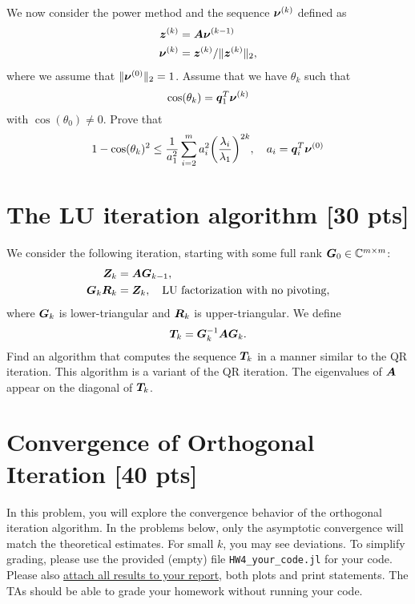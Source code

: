 \documentclass[twoside,10pt]{article}
\begin{document}
We now consider the power method and the sequence $\bm{\nu}^{(k)}$  defined as 
\begin{align}
  \bm{z}^{(k)} &= \bm{A} \bm{\nu}^{(k - 1)} \\
  \bm{\nu}^{(k)} &= \bm{z}^{(k)} / \|\bm{z}^{(k)}\|_2,
\end{align}
where we assume that $\|\bm{\nu}^{(0)}\|_2 = 1$. Assume that we have $\theta_k$ such that 
\begin{equation}
  \cos(\theta_k) = \bm{q}_1^{T} \bm{\nu}^{(k)}
\end{equation}
with $\cos(\theta_{0}) \neq 0$.
Prove that 
\begin{equation}
  1 - \cos(\theta_k)^2 \leq \frac{1}{a_1^2} \sum \limits_{i = 2}^m a_i^2\left(\frac{\lambda_{i}}{\lambda_1}\right)^{2k}, \quad a_i = \vct{q}_i^T \vct{\nu}^{(0)} 
\end{equation}

\section{The LU iteration algorithm [30 pts]} 
We consider the following iteration, starting with some full rank $\bm{G}_0 \in \mathbb{C}^{m \times m}$:
\begin{align}
  \bm{Z}_k &= \bm{A} \bm{G}_{k - 1}, \\
  \bm{G}_{k} \bm{R}_{k} &= \bm{Z}_k, \quad \text{LU factorization with no pivoting}, 
\end{align}
where $\bm{G}_k$ is lower-triangular and $\bm{R}_{k}$ is upper-triangular.
We define 
\begin{equation}
  \bm{T}_k = \bm{G}_{k}^{-1} \bm{A} \bm{G}_k.
\end{equation}
Find an algorithm that computes the sequence $\bm{T}_{k}$ in a manner similar to the QR iteration. 
This algorithm is a variant of the QR iteration. The eigenvalues of $\bm{A}$ appear on the diagonal of $\bm{T}_k$.



\section{Convergence of Orthogonal Iteration [40 pts]}
  In this problem, you will explore the convergence behavior of the orthogonal iteration algorithm. In the problems below, only the asymptotic convergence will match the theoretical estimates. 
  For small $k$, you may see deviations. 
  To simplify grading, please use the provided (empty) file \texttt{HW4\_your\_code.jl} for your code. 
  Please also \underline{attach all results to your report}, both plots and print statements. 
  The TAs should be able to grade your homework without running your code. 
\end{document}
